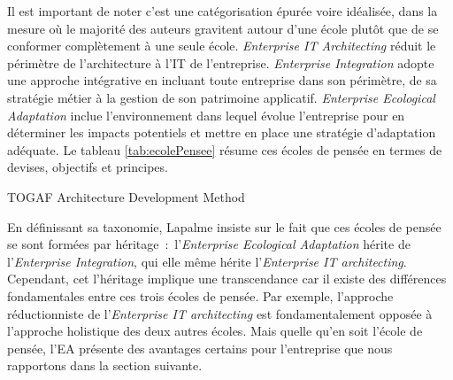 
Il est important de noter c'est une catégorisation épurée voire idéalisée, 
dans la mesure où le majorité des auteurs gravitent autour d'une école plutôt que 
de se conformer complètement à une seule école. \textit{Enterprise IT Architecting} réduit le périmètre de l'architecture à l'IT de l'entreprise. \textit{Enterprise Integration} adopte une approche intégrative en incluant toute entreprise dans son périmètre, de sa stratégie métier à la gestion de son patrimoine applicatif. \textit{Enterprise Ecological Adaptation} inclue l'environnement dans lequel évolue l'entreprise pour en déterminer les impacts potentiels et mettre en place une stratégie d'adaptation adéquate. Le tableau \ref{tab:ecolePensee} résume ces écoles de pensée en termes de devises, objectifs et principes. 

\begin{table}
		
	\caption{TOGAF Architecture Development Method  \protect\cite{zachman1987framework}}
 	\label{tab:ecolePensee}
\end{table}

En définissant sa taxonomie, Lapalme insiste sur le fait que ces écoles de pensée se sont formées par héritage~:~l'\textit{Enterprise Ecological Adaptation} hérite de l'\textit{Enterprise Integration}, qui elle même hérite l'\textit{Enterprise IT architecting}. Cependant, cet l'héritage implique une transcendance car il existe des différences fondamentales entre ces trois écoles de pensée. Par exemple, l'approche réductionniste de l'\textit{Enterprise IT architecting} est fondamentalement opposée à l'approche holistique des deux autres écoles. Mais quelle qu'en soit l'école de pensée, l'EA présente des avantages certains pour l'entreprise que nous rapportons dans la section suivante. 


